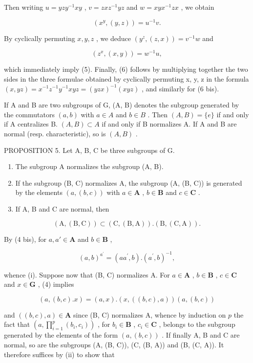 Then writing \(u = yzy^{-1}xy\) , \(v = zxz^{-1}yz\) and \(w = xyx^{-1}zx\) , we obtain

\[
(x ^ {y}, (y, z)) = u ^ {- 1} v.
\]

By cyclically permuting \(x, y, z\) , we deduce \((y^z, (z, x)) = v^{-1}w\) and

\[
\left(z ^ {x}, (x, y)\right) = w ^ {- 1} u,
\]

which immediately imply (5). Finally, (6) follows by multiplying together the two sides in the three formulae obtained by cyclically permuting x, y, z in the formula \((x, yz) = x^{-1}z^{-1}y^{-1}xyz = (yzx)^{-1}(xyz)\) , and similarly for (6 bis).

If A and B are two subgroups of G, (A, B) denotes the subgroup generated by the commutators \((a, b)\) with \(a \in A\) and \(b \in B\) . Then \((A, B) = \{e\}\) if and only if A centralizes B. \((A, B) \subset A\) if and only if B normalizes A. If A and B are normal (resp. characteristic), so is \((A, B)\) .

PROPOSITION 5. Let A, B, C be three subgroups of G.

\begin{enumerate}
\def\labelenumi{(\roman{enumi})}
\item
  The subgroup A normalizes the subgroup (A, B).
\item
  If the subgroup (B, C) normalizes A, the subgroup (A, (B, C)) is generated by the elements \((a, (b, c))\) with \(a \in \mathbf{A}\) , \(b \in \mathbf{B}\) and \(c \in \mathbf{C}\) .
\item
  If A, B and C are normal, then
\end{enumerate}

\[
(\mathrm{A}, (\mathrm{B}, \mathrm{C})) \subset (\mathrm{C}, (\mathrm{B}, \mathrm{A})). (\mathrm{B}, (\mathrm{C}, \mathrm{A})).
\]

By (4 bis), for \(a, a' \in \mathbf{A}\) and \(b \in \mathbf{B}\) ,

\[
(a, b) ^ {a ^ {\prime}} = (a a ^ {\prime}, b). (a ^ {\prime}, b) ^ {- 1},
\]

whence (i). Suppose now that (B, C) normalizes A. For \(a \in \mathbf{A}\) , \(b \in \mathbf{B}\) , \(c \in \mathbf{C}\) and \(x \in \mathbf{G}\) , (4) implies

\[
(a, (b, c). x) = (a, x). (x, ((b, c), a)) (a, (b, c))
\]

and \(((b, c), a) \in \mathbf{A}\) since (B, C) normalizes A, whence by induction on \(p\) the fact that \(\left(a, \prod_{i=1}^{p} (b_i, c_i)\right)\) , for \(b_i \in \mathbf{B}\) , \(c_i \in \mathbf{C}\) , belongs to the subgroup generated by the elements of the form \((a, (b, c))\) . If finally A, B and C are normal, so are the subgroups (A, (B, C)), (C, (B, A)) and (B, (C, A)). It therefore suffices by (ii) to show that

